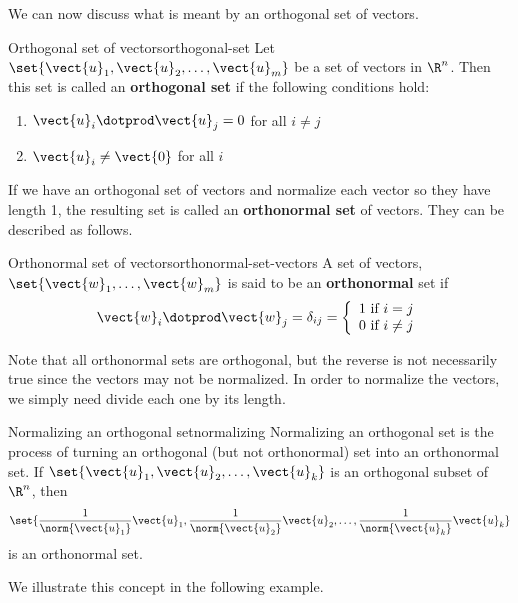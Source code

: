 We can now discuss what is meant by an orthogonal set of vectors.

\begin{definition}{Orthogonal set of vectors}{orthogonal-set}
Let $\set{\vect{u}_1, \vect{u}_2,\ldots, \vect{u}_m}$ be a set of
vectors in $\R^n$. Then this set is called an
\textbf{orthogonal set}
if the following conditions hold:
\begin{enumerate}
\item
$\vect{u}_i \dotprod \vect{u}_j = 0$ for all $i \neq j$
\item
$\vect{u}_i \neq \vect{0}$ for all $i$
\end{enumerate}
\end{definition}

If we have an orthogonal set of vectors and normalize each vector so
they have length 1, the resulting set is called an \textbf{orthonormal
set} of vectors. They can be described as follows.

\begin{definition}{Orthonormal set of vectors}{orthonormal-set-vectors}
A set of vectors, $\set{\vect{w}_{1},\ldots,\vect{w}_{m}} $
is said to be an
\textbf{orthonormal}
set if
\[
\vect{w}_i \dotprod \vect{w}_j = \delta _{ij} = \left\{
\begin{array}{c}
1\text{ if }i=j \\
0\text{ if }i\neq j
\end{array}
\right.
\]
\end{definition}

Note that all orthonormal sets are orthogonal, but the reverse is not
necessarily true since the vectors may not be normalized. In order to
normalize the vectors, we simply need divide each one by its length.

\begin{definition}{Normalizing an orthogonal set}{normalizing}
Normalizing an orthogonal set is the process of
turning an orthogonal (but not orthonormal) set into
an orthonormal set.
If $\set{\vect{u}_1, \vect{u}_2, \ldots, \vect{u}_k}$
is an orthogonal subset of $\R^n$,
then
\[ \set{
\frac{1}{\norm{\vect{u}_1}}\vect{u}_1,
\frac{1}{\norm{\vect{u}_2}}\vect{u}_2, \ldots,
\frac{1}{\norm{\vect{u}_k}}\vect{u}_k }
\]
is an orthonormal set.
\end{definition}

We illustrate this concept in the following example.

